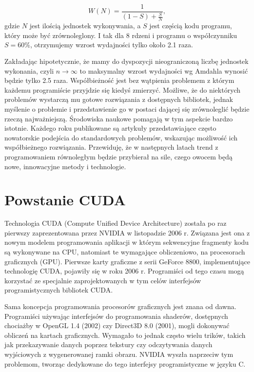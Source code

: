 \begin{equation}
W(N) = \frac{1}{(1-S) + \frac{S}{N}},
\end{equation}
gdzie $N$ jest ilością jednostek wykonywania, a $S$ jest częścią kodu programu,
	który może być zrównoleglony. I tak dla 8 rdzeni i programu o współczynniku
	$S=60\%$, otrzymujemy wzrost wydajności tylko około 2.1 raza.

Zakładając hipotetycznie, że mamy do dyspozycji nieograniczoną liczbę jednostek
wykonania, czyli $n \to \infty$ to maksymalny wzrost wydajności
wg Amdahla wynosić będzie tylko 2.5 raza.
Współbieżność jest bez wątpienia problemem z którym każdemu programiście
przyjdzie się kiedyś zmierzyć. Możliwe, że do niektórych problemów wystarczą mu
gotowe rozwiązania z dostępnych bibliotek, jednak myślenie o problemie i
przedstawienie go w postaci dającej się zrównoleglić będzie rzeczą
najważniejszą. Środowiska naukowe pomagają w tym aspekcie bardzo istotnie.
Każdego roku publikowane są artykuły przedstawiające często nowatorskie
podejścia do standardowych problemów, wskazując możliwość ich współbieżnego rozwiązania.
Przewiduję, że w następnych latach trend z programowaniem równoległym będzie
przybierał na sile, czego owocem będą nowe, innowacyjne metody i technologie.

\section{Powstanie CUDA}

Technologia CUDA (Compute Unified Device Architecture) została po raz pierwszy
zaprezentowana przez NVIDIA w listopadzie 2006 r. Związana jest ona z nowym
modelem
programowania aplikacji w którym sekwencyjne fragmenty kodu są wykonywane na
CPU, natomiast te wymagające obliczeniowo, na procesorach graficznych (GPU).
Pierwsze karty graficzne z serii GeForce 8800, implementujące technologię CUDA,
		 pojawiły się w roku 2006 r. Programiści od tego czasu mogą korzystać ze
		 specjalnie zaprojektowanych w tym celów interfejsów programistycznych
		 bibliotek CUDA.

Sama koncepcja programowania procesorów graficznych jest znana od dawna.
Programiści używając interfejsów do programowania shaderów, dostępnych chociażby
w OpenGL 1.4 (2002) czy Direct3D 8.0 (2001), mogli dokonywać 
obliczeń na kartach graficznych. Wymagało to jednak często wielu trików, takich
jak przekazywanie danych poprzez tekstury czy odczytywania danych wyjściowych z
wygenerowanej ramki obrazu. NVIDIA wyszła naprzeciw tym problemom, tworząc
dedykowane do tego interfejsy programistyczne w języku C.

